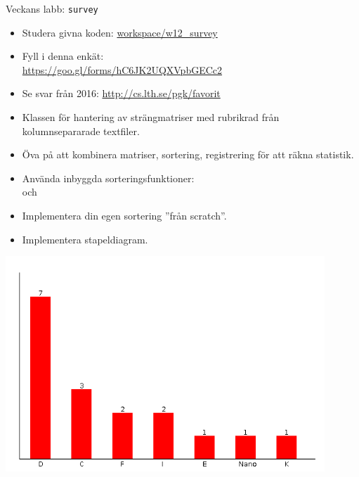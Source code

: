 



\begin{Slide}{Veckans labb: \texttt{survey}}\SlideFontTiny
\begin{minipage}{0.71\textwidth}
\vspace{0.25em}
\begin{itemize}
\item Studera givna koden: {\SlideFontTiny \href{https://github.com/lunduniversity/introprog/tree/master/workspace/w12_survey/src/main/scala/stats}{workspace/w12\_survey}}
\item Fyll i denna enkät:
\\{\SlideFontTiny \url{https://goo.gl/forms/hC6JK2UQXVpbGECc2}}
\item Se svar från 2016: \url{http://cs.lth.se/pgk/favorit}
\end{itemize}

\begin{itemize}
\item Klassen  för hantering av strängmatriser med rubrikrad från kolumnsepararade textfiler.
\item Öva på att kombinera matriser, sortering, registrering för att räkna statistik.
\item Använda inbyggda sorteringsfunktioner: \\ och 
\item Implementera din egen sortering ''från scratch''.
\end{itemize}
\begin{itemize}
\item Implementera stapeldiagram.
\end{itemize}
\end{minipage}
\hfill\begin{minipage}{0.25\textwidth}
\centering
\includegraphics[width=0.9\textwidth]{../img/survey/bar}


\end{minipage}
\end{Slide}
